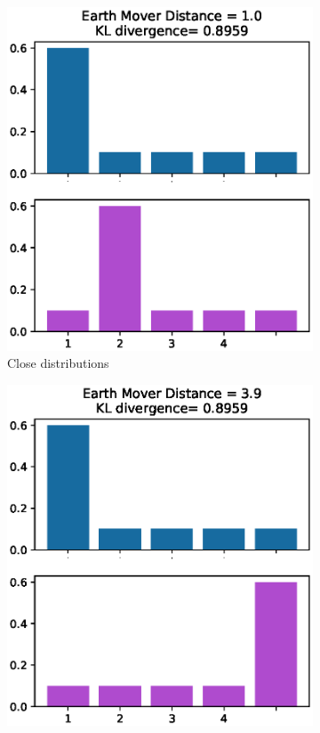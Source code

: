 \begin{figure}[t]
    \begin{subfigure}{.5\textwidth}
        \centering
        \includegraphics[width=1.0\linewidth]{figures/graphs/EMDvsKLclose.eps}
        \caption{Close distributions}
        \label{fig:closedist}
    \end{subfigure}%
    \begin{subfigure}{.5\textwidth}
        \centering
        \includegraphics[width=1.0\linewidth]{figures/graphs/EMDvsKLfar.eps}

\end{subfigure}
\end{figure}
